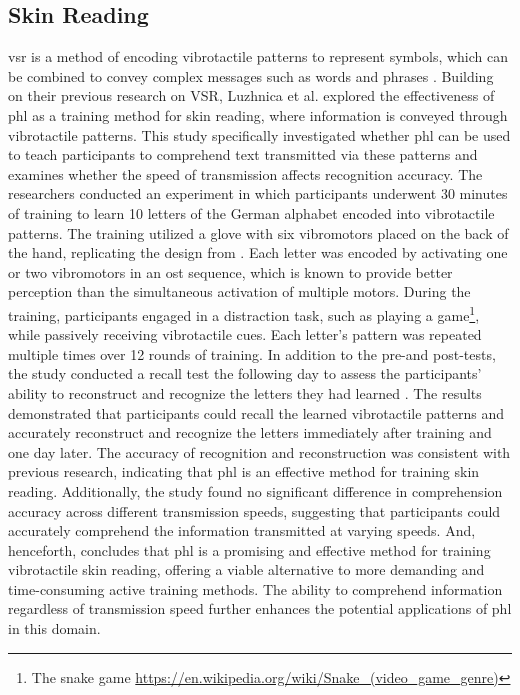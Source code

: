 \subsection{Skin Reading}

\Gls{vsr} \cite{Luzhnica2016} is a method of encoding vibrotactile patterns to represent symbols, which can be combined to convey complex messages such as words and phrases \cite{Luzhnica2018}. Building on their previous research on VSR, Luzhnica et al. \cite{Luzhnica2018} explored the effectiveness of \gls{phl} as a training method for skin reading, where information is conveyed through vibrotactile patterns. This study specifically investigated whether \gls{phl} can be used to teach participants to comprehend text transmitted via these patterns and examines whether the speed of transmission affects recognition accuracy.
The researchers conducted an experiment in which participants underwent 30 minutes of training to learn 10 letters of the German alphabet encoded into vibrotactile patterns. The training utilized a glove with six vibromotors placed on the back of the hand, replicating the design from \cite{Luzhnica2016}. Each letter was encoded by activating one or two vibromotors in an \gls{ost} sequence, which is known to provide better perception than the simultaneous activation of multiple motors.
During the training, participants engaged in a distraction task, such as playing a game\footnote{The snake game \url{https://en.wikipedia.org/wiki/Snake_(video_game_genre)}}, while passively receiving vibrotactile cues. Each letter's pattern was repeated multiple times over 12 rounds of training. In addition to the pre-and post-tests, the study conducted a recall test the following day to assess the participants' ability to reconstruct and recognize the letters they had learned \cite{Luzhnica2018}.
The results demonstrated that participants could recall the learned vibrotactile patterns and accurately reconstruct and recognize the letters immediately after training and one day later. The accuracy of recognition and reconstruction was consistent with previous research, indicating that \gls{phl} is an effective method for training skin reading. Additionally, the study found no significant difference in comprehension accuracy across different transmission speeds, suggesting that participants could accurately comprehend the information transmitted at varying speeds.
And, henceforth, concludes that \gls{phl} is a promising and effective method for training vibrotactile skin reading, offering a viable alternative to more demanding and time-consuming active training methods. The ability to comprehend information regardless of transmission speed further enhances the potential applications of \gls{phl} in this domain.



